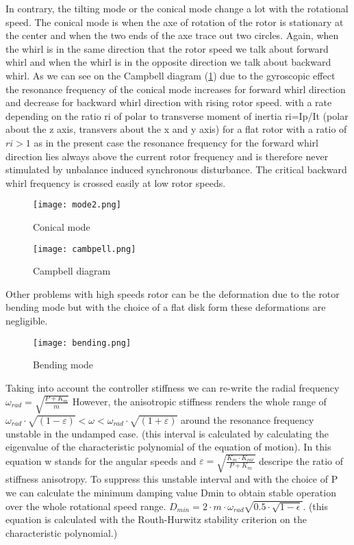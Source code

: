 In contrary, the tilting mode or the conical mode change a lot with the rotational speed. The conical mode is when the axe of rotation of the rotor is stationary at the center and when the two ends of the axe trace out two circles. Again, when the whirl is in the same direction that the rotor speed we talk about forward whirl and when the whirl is in the opposite direction we talk about backward whirl. As we can see on the Campbell diagram (\ref{campbell}) due to the gyroscopic effect the resonance frequency of the conical mode increases for forward whirl direction and decrease for backward whirl direction with rising rotor speed.
with a rate depending on the ratio ri of polar to transverse moment of inertia ri=Ip/It (polar about the z axis, transvers about the x and y axis) for a flat rotor with a ratio of $ri>1$ as in the present case the resonance frequency for the forward whirl direction lies always above the current rotor frequency and is therefore never stimulated by unbalance induced synchronous disturbance. The critical backward whirl frequency is crossed easily at low rotor speeds.
\begin{figure}[H]
    \centering
    \texttt{[image: mode2.png]}
    \caption{Conical mode}
\end{figure}

\begin{figure}[H]
    \centering
    \texttt{[image: cambpell.png]}
    \caption{Campbell diagram}
    \label{campbell}
\end{figure}


Other problems with high speeds rotor can be the deformation due to the rotor bending mode but with the choice of a flat disk form these deformations are negligible.
\begin{figure}[H]
    \centering
    \texttt{[image: bending.png]}
    \caption{Bending mode}
\end{figure}


Taking into account the controller stiffness we can re-write the radial frequency
${ \omega  }_{ rad }=\sqrt { \frac { P+{ K }_{ m } }{ m }  } $
However, the anisotropic stiffness renders the whole range of 
${ \omega  }_{ rad }\cdot \sqrt { (1-\varepsilon ) } <\omega <{ \omega  }_{ rad }\cdot \sqrt { (1+\varepsilon ) } $ around the resonance frequency unstable in the undamped case.
(this interval is calculated by calculating the eigenvalue of the characteristic polynomial of the equation of motion).
In this equation w stands for the angular speeds and $\varepsilon =\sqrt { \frac { { K }_{ m }\cdot { K }_{ var } }{ P+{ K }_{ m } }  } $ descripe the ratio of stiffness anisotropy.
To suppress this unstable interval and with the choice of P we can calculate the minimum damping value Dmin to obtain stable operation over the whole rotational speed range. ${ D }_{ min }=2\cdot m\cdot { \omega  }_{ rad }\sqrt { 0.5\cdot \sqrt { 1-\epsilon  }  } $.
(this equation is calculated with the Routh-Hurwitz stability criterion on the characteristic polynomial.) 








